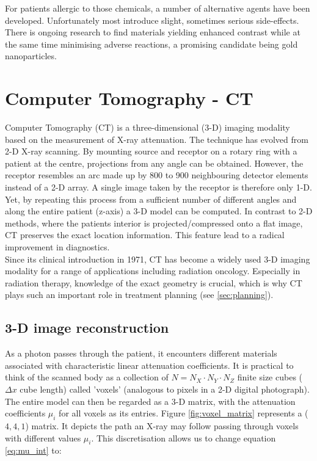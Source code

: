 For patients allergic to those chemicals, a number of alternative agents have been developed.
Unfortunately most introduce slight, sometimes serious side-effects.
There is ongoing research to find materials yielding enhanced contrast while at the same time minimising adverse reactions, a promising candidate being gold nanoparticles.

\section{Computer Tomography - CT}
Computer Tomography (CT) is a three-dimensional (3-D) imaging modality based on the measurement of X-ray attenuation.
The technique has evolved from 2-D X-ray scanning.
By mounting source and receptor on a rotary ring with a patient at the centre, projections from any angle can be obtained.
However, the receptor resembles an arc made up by 800 to 900 neighbouring detector elements instead of a 2-D array.
A single image taken by the receptor is therefore only 1-D. Yet, by repeating this process from a sufficient number of different angles and along the entire patient (z-axis) a 3-D model can be computed.
In contrast to 2-D methods, where the patients interior is projected/compressed onto a flat image, CT preserves the exact location information. This feature lead to a radical improvement in diagnostics.	 \\

Since its clinical introduction in 1971, CT has become a widely used 3-D imaging modality for a range of applications including radiation oncology. Especially in radiation therapy, knowledge of the exact geometry is crucial, which is why CT plays such an important role in treatment planning (see \ref{sec:planning}).

\subsection{3-D image reconstruction}
As a photon passes through the patient, it encounters different materials associated with characteristic linear attenuation coefficients.
It is practical to think of the scanned body as a collection of $N = N_X\cdot N_Y\cdot N_Z$ finite size cubes ($\Delta x$ cube length) called 'voxels' (analogous to pixels in a 2-D digital photograph).
The entire model can then be regarded as a 3-D matrix, with the attenuation coefficients $\mu_i$ for all voxels as its entries.
Figure \ref{fig:voxel_matrix} represents a ($4, 4, 1$) matrix.
It depicts the path an X-ray may follow passing through voxels with different values $\mu_i$.
This discretisation allows us to change equation \ref{eq:mu_int} to:


